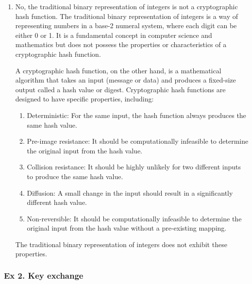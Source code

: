 {\begin{enumerate}
	The reason why strongly collision-resistant functions are also weakly collision-resistant is that if an attacker can find a specific pair of inputs that collide, they can demonstrate a general collision by applying additional modifications to those inputs. In other words, if there exists a pair of inputs A and B such that hash(A) = hash(B), an attacker can create a new pair of inputs A' and B' such that hash(A') = hash(B') by manipulating A and B based on the collision found.
	
	\item No, the traditional binary representation of integers is not a cryptographic hash function. The traditional binary representation of integers is a way of representing numbers in a base-2 numeral system, where each digit can be either 0 or 1. It is a fundamental concept in computer science and mathematics but does not possess the properties or characteristics of a cryptographic hash function.
	
	A cryptographic hash function, on the other hand, is a mathematical algorithm that takes an input (message or data) and produces a fixed-size output called a hash value or digest. Cryptographic hash functions are designed to have specific properties, including:
	
	\begin{enumerate}
		\item Deterministic: For the same input, the hash function always produces the same hash value.
		\item 	Pre-image resistance: It should be computationally infeasible to determine the original input from the hash value.
		\item 	Collision resistance: It should be highly unlikely for two different inputs to produce the same hash value.
		\item 	Diffusion: A small change in the input should result in a significantly different hash value.
		\item 	Non-reversible: It should be computationally infeasible to determine the original input from the hash value without a pre-existing mapping.
	\end{enumerate}
	
	The traditional binary representation of integers does not exhibit these properties.
	\end{enumerate}}
	
	\subsubsection{Ex 2. Key exchange}	
	
